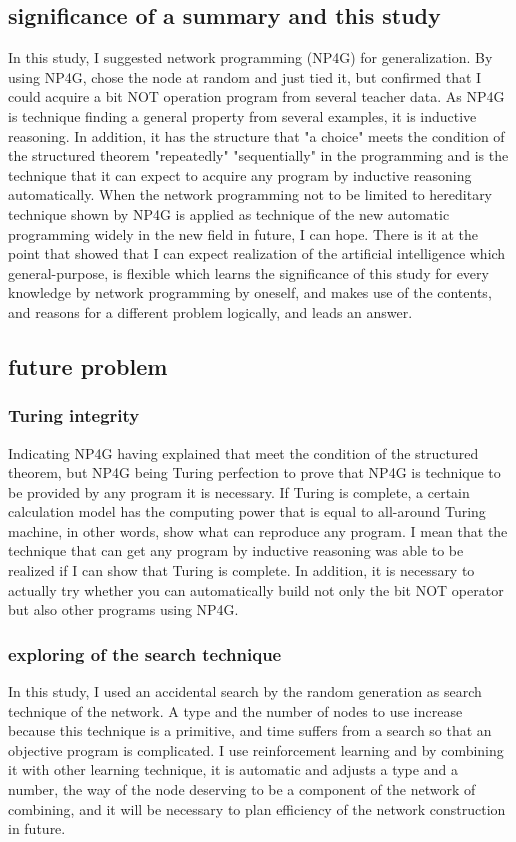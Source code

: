 \documentclass{article}
\begin{document}
\subsection {significance of a summary and this study}
In this study, I suggested network programming (NP4G) for generalization.
By using NP4G, chose the node at random and just tied it, but confirmed that I could acquire a bit NOT operation program from several teacher data.
As NP4G is technique finding a general property from several examples, it is inductive reasoning.
In addition, it has the structure that "a choice" meets the condition of the structured theorem "repeatedly" "sequentially" in the programming and is the technique that it can expect to acquire any program by inductive reasoning automatically.
When the network programming not to be limited to hereditary technique shown by NP4G is applied as technique of the new automatic programming widely in the new field in future, I can hope.
There is it at the point that showed that I can expect realization of the artificial intelligence which general-purpose, is flexible which learns the significance of this study for every knowledge by network programming by oneself, and makes use of the contents, and reasons for a different problem logically, and leads an answer.
\subsection {future problem}
\subsubsection {Turing integrity}
Indicating NP4G having explained that meet the condition of the structured theorem, but NP4G being Turing perfection to prove that NP4G is technique to be provided by any program it is necessary.
If Turing is complete, a certain calculation model has the computing power that is equal to all-around Turing machine, in other words, show what can reproduce any program.
I mean that the technique that can get any program by inductive reasoning was able to be realized if I can show that Turing is complete.
In addition, it is necessary to actually try whether you can automatically build not only the bit NOT operator but also other programs using NP4G.
\subsubsection {exploring of the search technique}
In this study, I used an accidental search by the random generation as search technique of the network.
A type and the number of nodes to use increase because this technique is a primitive, and time suffers from a search so that an objective program is complicated.
I use reinforcement learning and by combining it with other learning technique, it is automatic and adjusts a type and a number, the way of the node deserving to be a component of the network of combining, and it will be necessary to plan efficiency of the network construction in future.
\end{document}
